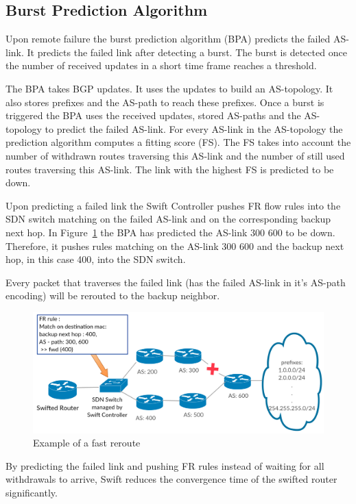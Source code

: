 \subsection{\label{chapter2:Swift:BPA}Burst Prediction Algorithm}
Upon remote failure the burst prediction algorithm (BPA) predicts the failed AS-link. It predicts the failed link after detecting a burst. The burst is detected once the number of received updates in a short time frame reaches a threshold.

The BPA takes BGP updates. It uses the updates to build an AS-topology. It also stores prefixes and the AS-path to reach these prefixes. Once a burst is triggered the BPA uses the received updates, stored AS-paths and the AS-topology to predict the failed AS-link. For every AS-link in the AS-topology the prediction algorithm computes a fitting score (FS). The FS takes into account the number of withdrawn routes traversing this AS-link and the number of still used routes traversing this AS-link. The link with the highest FS is predicted to be down. 

Upon predicting a failed link the Swift Controller pushes FR flow rules into the SDN switch matching on the failed AS-link and on the corresponding backup next hop. In Figure~\ref{fig:swift_FR} the BPA has predicted the AS-link 300 600 to be down. Therefore, it pushes rules matching on the AS-link 300 600 and the backup next hop, in this case 400, into the SDN switch.

Every packet that traverses the failed link (has the failed AS-link in it's AS-path encoding) will be rerouted to the backup neighbor.

\begin{figure}[h]
\center
\includegraphics[scale = 0.32]{Figures/bckgrnd_swift_fr.pdf}
\caption{Example of a fast reroute}
\label{fig:swift_FR}
\end{figure}

By predicting the failed link and pushing FR rules instead of waiting for all withdrawals to arrive, Swift reduces the convergence time of the swifted router significantly.

